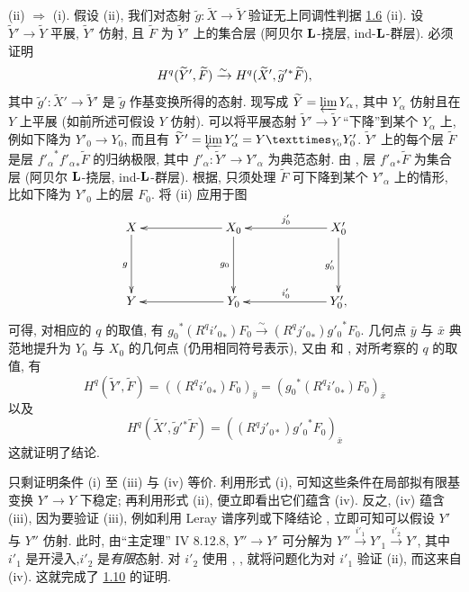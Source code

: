(ii) $\Rightarrow$ (i). 假设 (ii), 我们对态射 $\widetilde{g}:\widetilde{X}\rightarrow \widetilde{Y}$ 验证无上同调性判据 \hyperref[XV.prop1.6]{1.6} (ii). 设 $\widetilde{Y}'\rightarrow \widetilde{Y}$ 平展, $\widetilde{Y}'$ 仿射, 且 $\widetilde{F}$ 为 $\widetilde{Y}'$ 上的集合层 (\resp 阿贝尔 $\mathbf{L}$-挠层, \resp ind-$\mathbf{L}$-群层). 必须证明
$$
H^{q}(\widetilde{Y}',\widetilde{F})\xrightarrow{\sim}
H^{q}(\widetilde{X}', \widetilde{g}'{}^{\ast}\widetilde{F}){},
$$
其中 $\widetilde{g}':\widetilde{X}'\rightarrow \widetilde{Y}'$ 是 $\widetilde{g}$ 作基变换所得的态射. 现写成 $\widetilde{Y}=\varprojlim Y_{\alpha}$, 其中 $Y_{\alpha}$ 仿射且在 $Y$ 上平展 (如前所述可假设 $Y$ 仿射). 可以将平展态射 $\widetilde{Y}'\rightarrow \widetilde{Y}$ “下降”到某个 $Y_{\alpha}$ 上, 例如下降为 $Y'_{0}\rightarrow Y_{0}$, 而且有 $\widetilde{Y}'=\varprojlim
Y'_{\alpha}=\fprod{Y}{Y'_{0}}{Y_{0}}$. $\widetilde{Y}'$ 上的每个层 $\widetilde{F}$ 是层 ${f'_{\alpha}}^{\ast}{f'_{\alpha}}_{\ast}\widetilde{F}$ 的归纳极限, 其中 $f'_{\alpha}:\widetilde{Y}'\rightarrow Y'_{\alpha}$ 为典范态射. 由 , 层 $f'_{\alpha}{}_{\ast}\widetilde{F}$ 为集合层 (\resp 阿贝尔 $\mathbf{L}$-挠层, \resp ind-$\mathbf{L}$-群层). 根据\pageoriginale {}, 只须处理 $\widetilde{F}$ 可下降到某个 $Y'_{\alpha}$ 上的情形, 比如下降为 $Y'_{0}$ 上的层 $F_{0}$. 将 (ii) 应用于图
$$
\xymatrix@C=2.25cm@R=1.5cm{
X \ar[d]_{g}& X_0 \ar[l] \ar[d]_{g_0}& X'_0 \ar[l]_{j'_0} \ar[d]_{g'_0}\\
Y & Y_0 \ar[l]& Y'_0 \ar[l]_{i'_0},
}
$$
可得, 对相应的 $q$ 的取值, 有 ${g_{0}}^{\ast}(R^{q}{i'_0}_{\ast})F_{0}\xrightarrow{\sim}
(R^{q}{j'_0}_{\ast}){g'_0}^{\ast}F_{0}$. 几何点 $\bar{y}$ 与 $\bar{x}$ 典范地提升为 $Y_{0}$ 与 $X_{0}$ 的几何点 (仍用相同符号表示), 又由  和 , 对所考察的 $q$ 的取值, 有
$$
H^{q}(\widetilde{Y}',\widetilde{F})=((R^{q}{i'_0}_{\ast})F_{0})_{\bar{y}}=({g_0}^{\ast}
(R^{q}{i'_0}_{\ast})F_0)_{\bar{x}}
$$
以及
$$
H^{q}(\widetilde{X}',{\widetilde{g}'}{}^{\ast}\widetilde{F})=((R^{q}j'_{0\ast}){g'_0}^{\ast}F_{0})_{\bar{x}}
$$
这就证明了结论.

只剩证明条件 (i) 至 (iii) 与 (iv) 等价. 利用形式 (i), 可知这些条件在局部拟有限基变换 $Y'\rightarrow Y$ 下稳定; 再利用形式 (ii), 便立即看出它们蕴含 (iv). 反之, (iv) 蕴含 (iii), 因为要验证 (iii), 例如利用 Leray 谱序列或下降结论 , 立即可知可以假设 $Y'$ 与 $Y''$ 仿射. 此时, 由“主定理” \EGA IV 8.12.8, $Y''\rightarrow Y'$ 可分解为 $Y''\xrightarrow{i'_1}Y'_1\xrightarrow{i'_2}Y'$, 其中 $i'_1$ 是开浸入,\pageoriginale $i'_2$ 是\emph{有限}态射. 对 $i'_2$ 使用 , , 就将问题化为对 $i'_1$ 验证 (ii), 而这来自 (iv). 这就完成了 \hyperref[XV.prop1.10]{1.10} 的证明.


